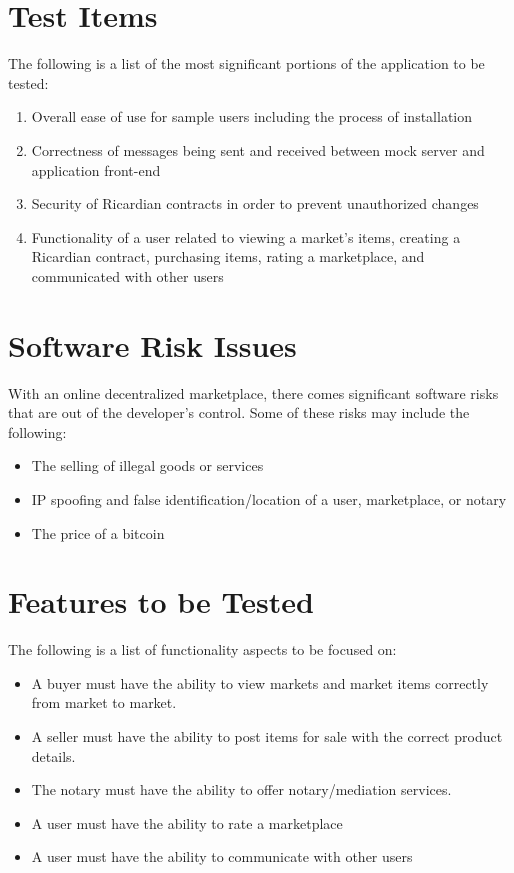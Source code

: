 \documentclass{article}
\begin{document}
\section*{Test Items}
The following is a list of the most significant portions of the application to be tested:
\newline
\begin{enumerate}
\item
Overall ease of use for sample users including the process of installation
\item
Correctness of messages being sent and received between mock server and application front-end
\item
Security of Ricardian contracts in order to prevent unauthorized changes
\item
Functionality of a user related to viewing a market's items, creating a Ricardian contract, purchasing items, rating a marketplace, and communicated with other users


\end{enumerate}

\section*{Software Risk Issues}
With an online decentralized marketplace, there comes significant software risks that are out of the developer's control.
Some of these risks may include the following:
\newline
\begin{itemize}
 \item
The selling of illegal goods or services
 \item
IP spoofing and false identification/location of a user, marketplace, or notary
 \item
The price of a bitcoin
\end{itemize}

\section*{Features to be Tested}
The following is a list of functionality aspects to be focused on:
\newline
\begin{itemize}
 \item
A buyer must have the ability to view markets and market items correctly from market to market.
 \item
A seller must have the ability to post items for sale with the correct product details.
 \item
The notary must have the ability to offer notary/mediation services.
\item
A user must have the ability to rate a marketplace
\item
A user must have the ability to communicate with other users
\end{itemize}
\end{document}
